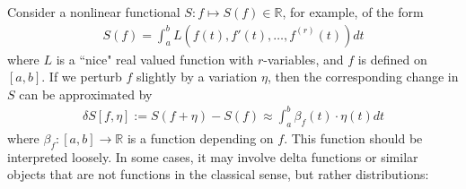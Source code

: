 \documentclass[12pt,b5paper,notitlepage]{article}
\theoremstyle{definition}
\theoremstyle{plain}
\newcommand{\Rbb}{\mathbb R}
\numberwithin{equation}{section}
\begin{document}
Consider a nonlinear functional $S:f\mapsto S(f)\in\Rbb$, for example, of the form
\begin{gather*}
S(f)=\int_a^b L(f(t),f'(t),\dots,f^{(r)}(t))dt
\end{gather*}
where $L$ is a ``nice" real valued function with $r$-variables, and $f$ is defined on $[a,b]$. If we perturb $f$ slightly by a variation $\eta$, then the corresponding change in $S$ can be approximated by
\begin{align}\label{eq2}
\delta S[f,\eta]:=S(f+\eta)-S(f)\approx \int_a^b  \beta_f(t)\cdot \eta(t)dt
\end{align}
where $\beta_f:[a,b]\rightarrow\Rbb$ is a function depending on $f$. This function should be interpreted loosely. In some cases, it may involve delta functions or similar objects that are not functions in the classical sense, but rather distributions:
\end{document}
